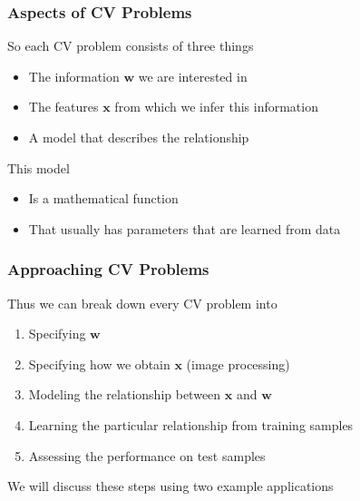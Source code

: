 \documentclass[xetex,professionalfont]{beamer}
\renewcommand{\vec}[1]{\ensuremath{\mathbf{#1}}}
\newcommand{\vw}{\vec{w}}
\newcommand{\vx}{\vec{x}}
\renewcommand\emph[1]{\textcolor{tuwcvl_inf_red}{#1}}
\begin{document}

\begin{frame}
\frametitle{Aspects of CV Problems}

So each CV problem consists of three things
\begin{itemize}
    \item The information $\vw$ we are interested in
    \item The \emph{features} $\vx$ from which we infer this information
    \item A \emph{model} that describes the relationship
\end{itemize}

\bigskip
This model 
\begin{itemize}
    \item Is a mathematical function
    \item That usually has parameters that are learned from data
\end{itemize}

\end{frame}


\begin{frame}
\frametitle{Approaching CV Problems}

Thus we can break down every CV problem into
\begin{enumerate}
    \item Specifying $\vw$
    \item Specifying how we obtain $\vx$ (image processing)
    \item Modeling the relationship between $\vx$ and $\vw$
    \item Learning the particular relationship from \emph{training samples}
    \item Assessing the performance on \emph{test samples}
\end{enumerate}

\bigskip
We will discuss these steps using two example applications

\end{frame}

\end{document}
